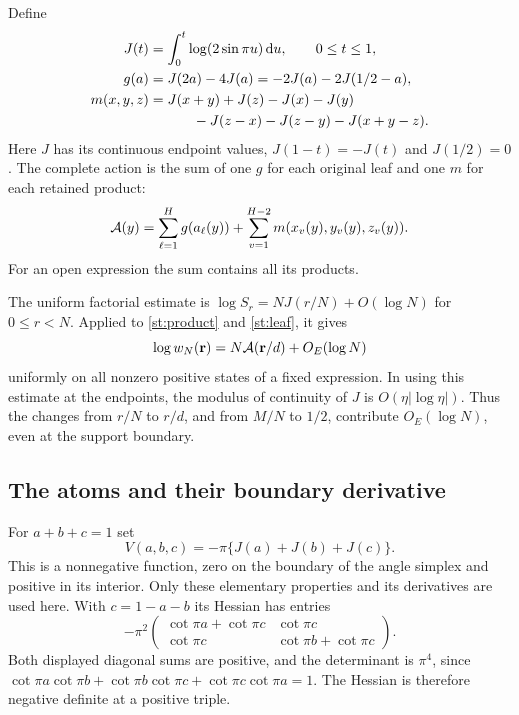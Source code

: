 Define
\begin{align}
 J(t)&=\int_0^t\log(2\sin\pi u)\dd u,\qquad 0\le t\le1,
       \label{st:J}\\
 g(a)&=J(2a)-4J(a)
       =-2J(a)-2J(1/2-a),\label{st:g}\\
 m(x,y,z)&=J(x+y)+J(z)-J(x)-J(y)\notag\\
 &\hspace{11mm}-J(z-x)-J(z-y)-J(x+y-z).
       \label{st:m}
\end{align}
Here $J$ has its continuous endpoint values,
$J(1-t)=-J(t)$ and $J(1/2)=0$.
The complete action is the sum of one $g$ for each
original leaf and one $m$ for each retained product:
\begin{equation}\label{st:action}
 \mathcal A(y)=\sum_{\ell=1}^H g(a_\ell(y))
             +\sum_{v=1}^{H-2}m(x_v(y),y_v(y),z_v(y)).
\end{equation}
For an open expression the sum contains all its products.

The uniform factorial estimate
\cite[Lemma 5.2]{Newton} is
$\log S_r=NJ(r/N)+O(\log N)$ for $0\le r<N$.
Applied to \eqref{st:product} and \eqref{st:leaf}, it gives
\begin{equation}\label{st:weight-rate}
 \log w_N(\mathbf r)=N\mathcal A(\mathbf r/d)+O_E(\log N)
\end{equation}
uniformly on all nonzero positive states of a fixed
expression. In using this estimate at the endpoints,
the modulus of continuity of $J$ is
$O(\eta|\log\eta|)$. Thus the changes from $r/N$ to
$r/d$, and from $M/N$ to $1/2$, contribute
$O_E(\log N)$, even at the support boundary.

\subsection{The atoms and their boundary derivative}
For $a+b+c=1$ set
\[
 V(a,b,c)=-\pi\{J(a)+J(b)+J(c)\}.
\]
This is a nonnegative function, zero on the boundary of
the angle simplex and positive in its interior.
Only these elementary properties and its derivatives
are used here. With $c=1-a-b$ its Hessian has entries
\[
 -\pi^2
 \begin{pmatrix}
  \cot\pi a+\cot\pi c&\cot\pi c\\
  \cot\pi c&\cot\pi b+\cot\pi c
 \end{pmatrix}.
\]
Both displayed diagonal sums are positive, and the
determinant is $\pi^4$, since
$\cot\pi a\cot\pi b+\cot\pi b\cot\pi c+
\cot\pi c\cot\pi a=1$. The Hessian is therefore negative
definite at a positive triple.


